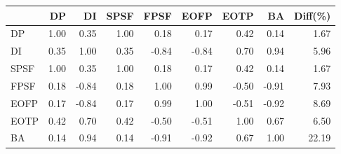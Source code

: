 \begin{tabular}{l|rrrrrrr|r}
\toprule
 & DP & DI & SPSF & FPSF & EOFP & EOTP & BA & Diff(\%)  \\
\midrule
DP & 1.00 & 0.35 & 1.00 & 0.18 & 0.17 & 0.42 & 0.14 & 1.67  \\
DI & 0.35 & 1.00 & 0.35 & -0.84 & -0.84 & 0.70 & 0.94 & 5.96  \\
SPSF & 1.00 & 0.35 & 1.00 & 0.18 & 0.17 & 0.42 & 0.14 & 1.67  \\
FPSF & 0.18 & -0.84 & 0.18 & 1.00 & 0.99 & -0.50 & -0.91 & 7.93  \\
EOFP & 0.17 & -0.84 & 0.17 & 0.99 & 1.00 & -0.51 & -0.92 & 8.69  \\
EOTP & 0.42 & 0.70 & 0.42 & -0.50 & -0.51 & 1.00 & 0.67 & 6.50  \\
BA & 0.14 & 0.94 & 0.14 & -0.91 & -0.92 & 0.67 & 1.00 & 22.19  \\
\bottomrule
\end{tabular}

